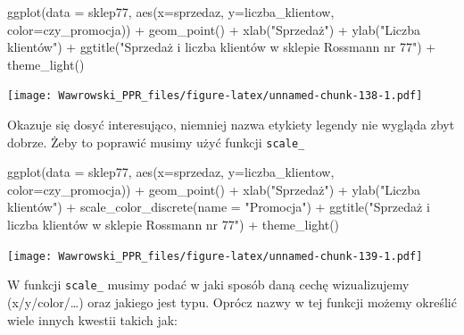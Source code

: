 \documentclass[
]{book}
\newenvironment{Shaded}{\begin{snugshade}}{\end{snugshade}}
\newcommand{\AttributeTok}[1]{\textcolor[rgb]{0.77,0.63,0.00}{#1}}
\newcommand{\FunctionTok}[1]{\textcolor[rgb]{0.00,0.00,0.00}{#1}}
\newcommand{\NormalTok}[1]{#1}
\newcommand{\SpecialCharTok}[1]{\textcolor[rgb]{0.00,0.00,0.00}{#1}}
\newcommand{\StringTok}[1]{\textcolor[rgb]{0.31,0.60,0.02}{#1}}
\begin{document}
\begin{Shaded}
\begin{Highlighting}[]
\FunctionTok{ggplot}\NormalTok{(}\AttributeTok{data =}\NormalTok{ sklep77, }\FunctionTok{aes}\NormalTok{(}\AttributeTok{x=}\NormalTok{sprzedaz, }\AttributeTok{y=}\NormalTok{liczba\_klientow, }\AttributeTok{color=}\NormalTok{czy\_promocja)) }\SpecialCharTok{+}
  \FunctionTok{geom\_point}\NormalTok{() }\SpecialCharTok{+}
  \FunctionTok{xlab}\NormalTok{(}\StringTok{"Sprzedaż"}\NormalTok{) }\SpecialCharTok{+}
  \FunctionTok{ylab}\NormalTok{(}\StringTok{"Liczba klientów"}\NormalTok{) }\SpecialCharTok{+}
  \FunctionTok{ggtitle}\NormalTok{(}\StringTok{"Sprzedaż i liczba klientów w sklepie Rossmann nr 77"}\NormalTok{) }\SpecialCharTok{+}
  \FunctionTok{theme\_light}\NormalTok{()}
\end{Highlighting}
\end{Shaded}

\texttt{[image: Wawrowski\_PPR\_files/figure-latex/unnamed-chunk-138-1.pdf]}

Okazuje się dosyć interesująco, niemniej nazwa etykiety legendy nie wygląda zbyt dobrze. Żeby to poprawić musimy użyć funkcji \texttt{scale\_}

\begin{Shaded}
\begin{Highlighting}[]
\FunctionTok{ggplot}\NormalTok{(}\AttributeTok{data =}\NormalTok{ sklep77, }\FunctionTok{aes}\NormalTok{(}\AttributeTok{x=}\NormalTok{sprzedaz, }\AttributeTok{y=}\NormalTok{liczba\_klientow, }\AttributeTok{color=}\NormalTok{czy\_promocja)) }\SpecialCharTok{+}
  \FunctionTok{geom\_point}\NormalTok{() }\SpecialCharTok{+}
  \FunctionTok{xlab}\NormalTok{(}\StringTok{"Sprzedaż"}\NormalTok{) }\SpecialCharTok{+}
  \FunctionTok{ylab}\NormalTok{(}\StringTok{"Liczba klientów"}\NormalTok{) }\SpecialCharTok{+}
  \FunctionTok{scale\_color\_discrete}\NormalTok{(}\AttributeTok{name =} \StringTok{"Promocja"}\NormalTok{) }\SpecialCharTok{+}
  \FunctionTok{ggtitle}\NormalTok{(}\StringTok{"Sprzedaż i liczba klientów w sklepie Rossmann nr 77"}\NormalTok{) }\SpecialCharTok{+}
  \FunctionTok{theme\_light}\NormalTok{()}
\end{Highlighting}
\end{Shaded}

\texttt{[image: Wawrowski\_PPR\_files/figure-latex/unnamed-chunk-139-1.pdf]}

W funkcji \texttt{scale\_} musimy podać w jaki sposób daną cechę wizualizujemy (x/y/color/\ldots) oraz jakiego jest typu. Oprócz nazwy w tej funkcji możemy określić wiele innych kwestii takich jak:
\end{document}
